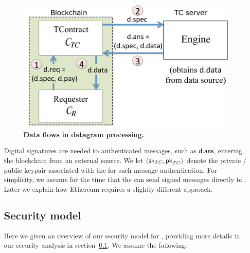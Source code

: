 \vspace{-2mm}
\begin{figure}[h!]
\centering
\includegraphics[width=\columnwidth]{figures/DataflowFig}
\caption{{\bf Data flows in datagram processing.}}
\label{fig:overview}
\end{figure}
\vspace{-2mm}

Digital signatures are needed to authenticated messages, such as ${\sf d.ans}$, entering the blockchain from an external source. We let $({{\sf sk}_{TC}}, {\sf pk}_{TC})$ denote the private / public keypair associated with the \encname for such message authentication. For simplicity, we assume for the time that the \encname can send signed messages directly to \tcont. Later we explain how Ethereum requires a slightly different approach.

\subsection{Security model}

Here we given an overview of our security model for \tc, providing more details in our security analysis in section~\ref{}. We assume the following:

